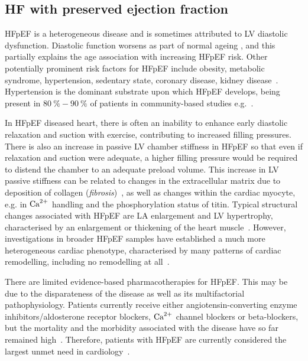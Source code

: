%
%
%
\subsection{HF with preserved ejection fraction}\label{sec:ch1HF_with_preserved_ejection_fraction}
HFpEF is a heterogeneous disease and is sometimes attributed to LV diastolic dysfunction. Diastolic function worsens as part of normal ageing \cite{Andersen:2014}, and this partially explains the age association with increasing HFpEF risk. Other potentially prominent risk factors for HFpEF include obesity, metabolic syndrome, hypertension, sedentary state, coronary disease, kidney disease~\cite{Pfeffer:2019}. Hypertension is the dominant substrate upon which HFpEF develops, being present in $\SI{80}{\percent}-\SI{90}{\percent}$ of patients in community-based studies e.g.~\cite{Borlaug:2009}.

\vspace{0.2cm}
In HFpEF diseased heart, there is often an inability to enhance early diastolic relaxation and suction with exercise, contributing to increased filling pressures. There is also an increase in passive LV chamber stiffness in HFpEF so that even if relaxation and suction were adequate, a higher filling pressure would be required to distend the chamber to an adequate preload volume. This increase in LV passive stiffness can be related to changes in the extracellular matrix due to deposition of collagen (\textit{fibrosis})~\cite{Burlew:2002}, as well as changes within the cardiac myocyte, e.g. in $\textrm{Ca}^{2+}$ handling and the phosphorylation status of titin. Typical structural changes associated with HFpEF are LA enlargement and LV hypertrophy, characterised by an enlargement or thickening of the heart muscle~\cite{Zile:2004}. However, investigations in broader HFpEF samples have established a much more heterogeneous cardiac phenotype, characterised by many patterns of cardiac remodelling, including no remodelling at all~\cite{Shah:2012}.

\vspace{0.2cm}
There are limited evidence-based pharmacotherapies for HFpEF. This may be due to the disparateness of the disease as well as its multifactorial pathophysiology. Patients currently receive either angiotensin-converting enzyme inhibitors/aldosterone receptor blockers, $\textrm{Ca}^{2+}$ channel blockers or beta-blockers, but the mortality and the morbidity associated with the disease have so far remained high~\cite{Adamczak:2020}. Therefore, patients with HFpEF are
currently considered the largest unmet need in cardiology~\cite{Owan:2006}.

